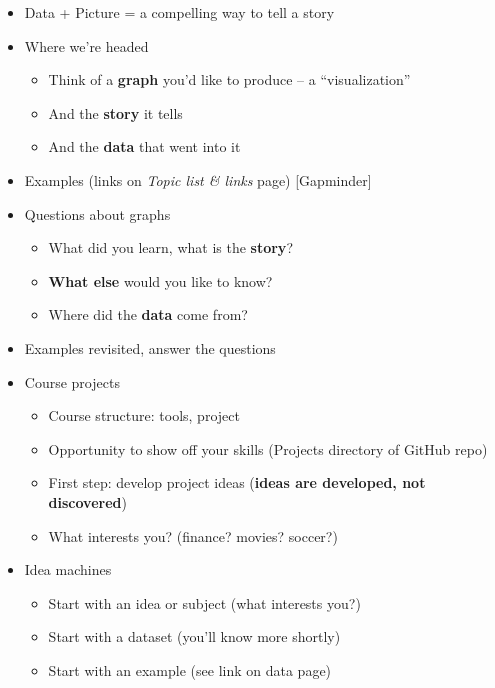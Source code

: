 \documentclass[11pt]{article}
\begin{document}
\begin{itemize}

\item Data + Picture = a compelling way to tell a story

\item Where we're headed
\begin{itemize}
\item Think of a {\bf graph\/} you'd like to produce -- a ``visualization''
\item And the {\bf story\/} it tells
\item And the {\bf data\/} that went into it
\end{itemize}

\item Examples (links on {\it Topic list \& links\/} page) [Gapminder]

\item Questions about graphs
\begin{itemize}
\item What did you learn, what is the {\bf story\/}?
\item {\bf What else} would you like to know?
\item Where did the {\bf data\/} come from?
\end{itemize}

\item Examples revisited, answer the questions

\item Course projects
\begin{itemize}
\item Course structure:  tools, project
\item Opportunity to show off your skills (Projects directory of GitHub repo)
\item First step:  develop project ideas ({\bf ideas are developed, not discovered})
\item What interests {you}? (finance? movies?  soccer?) 
\end{itemize}

\item Idea machines
\begin{itemize}
\item Start with an idea or subject (what interests you?)   
\item Start with a dataset (you'll know more shortly) 
\item Start with an example (see link on data page) 
\end{itemize}


\end{itemize}
\end{document}
